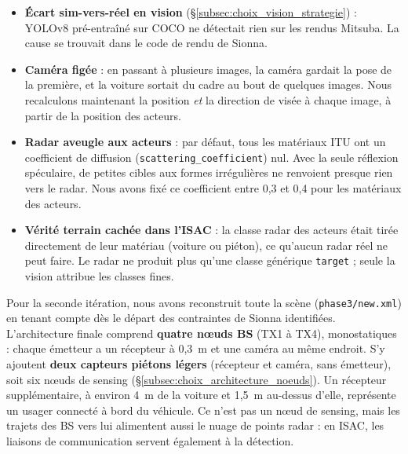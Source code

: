 \documentclass[12pt,a4paper,titlepage]{article}
\begin{document}
\begin{itemize}[leftmargin=1.5em]
    \item \textbf{Écart sim-vers-réel en vision} (\S\ref{subsec:choix_vision_strategie}) : YOLOv8 pré-entraîné sur COCO ne détectait rien sur les rendus Mitsuba. La cause se trouvait dans le code de rendu de Sionna.
    \item \textbf{Caméra figée} : en passant à plusieurs images, la caméra gardait la pose de la première, et la voiture sortait du cadre au bout de quelques images. Nous recalculons maintenant la position \emph{et} la direction de visée à chaque image, à partir de la position des acteurs.
    \item \textbf{Radar aveugle aux acteurs} : par défaut, tous les matériaux ITU ont un coefficient de diffusion (\texttt{scat\-ter\-ing\_co\-ef\-fi\-cient}) nul. Avec la seule réflexion spéculaire, de petites cibles aux formes irrégulières ne renvoient presque rien vers le radar. Nous avons fixé ce coefficient entre 0,3 et 0,4 pour les matériaux des acteurs.
    \item \textbf{Vérité terrain cachée dans l'ISAC} : la classe radar des acteurs était tirée directement de leur matériau (voiture ou piéton), ce qu'aucun radar réel ne peut faire. Le radar ne produit plus qu'une classe générique \texttt{target} ; seule la vision attribue les classes fines.
\end{itemize}

Pour la seconde itération, nous avons reconstruit toute la scène (\texttt{phase3/new.xml}) en tenant compte dès le départ des contraintes de Sionna identifiées. L'architecture finale comprend \textbf{quatre n\oe uds BS} (TX1 à TX4), monostatiques : chaque émetteur a un récepteur à 0,3~m et une caméra au même endroit. S'y ajoutent \textbf{deux capteurs piétons légers} (récepteur et caméra, sans émetteur), soit six n\oe uds de sensing (\S\ref{subsec:choix_architecture_noeuds}). Un récepteur supplémentaire, à environ 4~m de la voiture et 1,5~m au-dessus d'elle, représente un usager connecté à bord du véhicule. Ce n'est pas un n\oe ud de sensing, mais les trajets des BS vers lui alimentent aussi le nuage de points radar : en ISAC, les liaisons de communication servent également à la détection.
\end{document}
